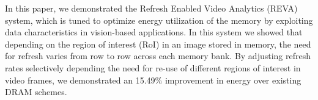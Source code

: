 In this paper, we demonstrated the Refresh Enabled Video Analytics (REVA) system, which is tuned to optimize energy utilization of the memory by exploiting data characteristics in vision-based applications. In this system we showed that depending on the region of interest (RoI) in an image stored in memory, the need for refresh varies from row to row across each memory bank. By adjusting refresh rates selectively depending the need for re-use of different regions of interest in video frames, we demonstrated an 15.49\% improvement in energy over existing DRAM schemes.
